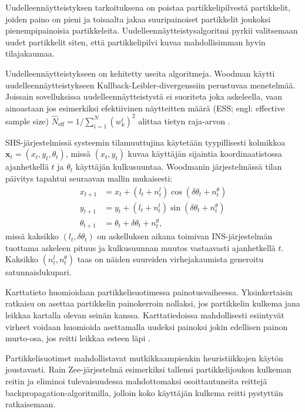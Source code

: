 Uudelleennäytteistyksen tarkoituksena on poistaa partikkelipilvestä
partikkelit, joiden paino on pieni ja toisaalta jakaa suuripainoiset
partikkelit joukoksi pienempipainoisia partikkeleita.
Uudelleennäytteistysalgoritmi pyrkii valitsemaan uudet partikkelit siten,
että partikkelipilvi kuvaa mahdollisimman hyvin tilajakaumaa.

Uudelleennäytteistykseen on kehitetty useita algoritmeja.
Woodman \cite{woodman2008} käytti uudelleennäytteistykseen
Kullback-Leibler-divergenssiin perustuvaa menetelmää. Joissain sovelluksissa
uudelleennäytteistystä ei suoriteta joka askeleella, vaan ainoastaan jos
esimerkiksi efektiivinen näytteitten määrä (ESS; engl: effective sample size)
$\hat{N}_{\text{eff}} = 1 / \sum_{i=1}^N (w_k^i)^2$ alittaa tietyn
raja-arvon \cite{fadjukoff2013}.

SHS-järjestelmissä systeemin tilamuuttujina käytetään tyypillisesti
kolmikkoa $\mathbf{x}_t = (x_t, y_t, \theta_t)$, missä $(x_t, y_t)$ kuvaa
käyttäjän sijaintia koordinaatistossa ajanhetkellä $t$ ja $\theta_t$
käyttäjän kulkusuuntaa. 
Woodmanin \cite{woodman2008} järjestelmässä tilan päivitys tapahtui
seuraavan mallin mukaisesti:
\begin{align}
  x_{t+1}       &= x_t + (l_t + n_t^l) \cos(\delta\theta_t + n_t^\theta) \\
  y_{t+1}       &= y_t + (l_t + n_t^l) \sin(\delta\theta_t + n_t^\theta) \\
  \theta_{t+1}  &= \theta_t + \delta\theta_t + n_t^\theta,
\end{align}
missä kaksikko $(l_t, \delta\theta_t)$ on askelluksen aikana toimivan
INS-järjestelmän tuottama askeleen pituus ja kulkusuunnan muutos vastaavasti
ajanhetkellä $t$. Kaksikko $(n_t^l, n_t^\theta)$ taas on näiden suureiden
virhejakaumista generoitu satunnaislukupari.

Karttatieto huomioidaan partikkelisuotimessa painotusvaiheessa. Yksinkertaisin
ratkaisu on asettaa partikkelin painokerroin nollaksi, jos partikkelin
kulkema jana leikkaa kartalla olevan seinän kanssa. Karttatiedoissa
mahdollisesti esiintyvät virheet voidaan huomioida asettamalla
uudeksi painoksi jokin edellisen painon murto-osa, jos reitti leikkaa
esteen läpi \cite{fadjukoff2013}.

Partikkelisuotimet mahdollistavat mutkikkaampienkin heuristiikkojen
käytön joustavasti. Rain \cite{rai2012} Zee-järjestelmä esimerkiksi
tallensi partikkelijoukon kulkeman reitin ja eliminoi tulevaisuudessa
mahdottomaksi osoittautuneita reittejä backpropagation-algoritmilla, jolloin
koko käyttäjän kulkema reitti pystyttiin ratkaisemaan.

